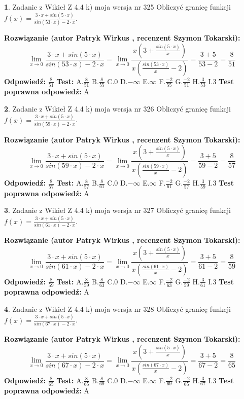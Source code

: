 \documentclass[12pt, a4paper]{article}
\theoremstyle{definition} %
\newtheorem{zad}{}
\newcommand{\zadStart}[1]{\begin{zad}#1\newline}
\newcommand{\zadStop}{\end{zad}}
\newcommand{\rozwStart}[2]{\noindent \textbf{Rozwiązanie (autor #1 , recenzent #2): }\newline}
\newcommand{\rozwStop}{\newline}
\newcommand{\odpStart}{\noindent \textbf{Odpowiedź:}\newline}
\newcommand{\odpStop}{\newline}
\newcommand{\testStart}{\noindent \textbf{Test:}\newline}
\newcommand{\testStop}{\newline}
\newcommand{\kluczStart}{\noindent \textbf{Test poprawna odpowiedź:}\newline}
\newcommand{\kluczStop}{\newline}
\begin{document}
\zadStart{Zadanie z Wikieł Z 4.4 k) moja wersja nr 325}
Obliczyć granicę funkcji $f(x)=\frac{3\cdot x +sin(5\cdot x)}{sin(53\cdot x) -2\cdot x}$.
\zadStop
\rozwStart{Patryk Wirkus}{Szymon Tokarski}
$$\lim\limits_{x\to 0}\frac{3\cdot x +sin(5\cdot x)}{sin(53\cdot x) -2\cdot x}
=\lim\limits_{x\to 0}\frac{x(3+\frac{sin(5\cdot x)}{x})}{x(\frac{sin(53\cdot x)}{x}-2)}
=\frac{3+5}{53-2} = \frac{8}{51}$$
\rozwStop
\odpStart
$\frac{8}{51}$
\odpStop
\testStart
A.$\frac{8}{51}$
B.$\frac{8}{55}$
C.$0$
D.$-\infty$
E.$\infty$
F.$\frac{-2}{55}$
G.$\frac{-2}{51}$
H.$\frac{3}{53}$
I.$3$
\testStop
\kluczStart
A
\kluczStop



\zadStart{Zadanie z Wikieł Z 4.4 k) moja wersja nr 326}
Obliczyć granicę funkcji $f(x)=\frac{3\cdot x +sin(5\cdot x)}{sin(59\cdot x) -2\cdot x}$.
\zadStop
\rozwStart{Patryk Wirkus}{Szymon Tokarski}
$$\lim\limits_{x\to 0}\frac{3\cdot x +sin(5\cdot x)}{sin(59\cdot x) -2\cdot x}
=\lim\limits_{x\to 0}\frac{x(3+\frac{sin(5\cdot x)}{x})}{x(\frac{sin(59\cdot x)}{x}-2)}
=\frac{3+5}{59-2} = \frac{8}{57}$$
\rozwStop
\odpStart
$\frac{8}{57}$
\odpStop
\testStart
A.$\frac{8}{57}$
B.$\frac{8}{61}$
C.$0$
D.$-\infty$
E.$\infty$
F.$\frac{-2}{61}$
G.$\frac{-2}{57}$
H.$\frac{3}{59}$
I.$3$
\testStop
\kluczStart
A
\kluczStop



\zadStart{Zadanie z Wikieł Z 4.4 k) moja wersja nr 327}
Obliczyć granicę funkcji $f(x)=\frac{3\cdot x +sin(5\cdot x)}{sin(61\cdot x) -2\cdot x}$.
\zadStop
\rozwStart{Patryk Wirkus}{Szymon Tokarski}
$$\lim\limits_{x\to 0}\frac{3\cdot x +sin(5\cdot x)}{sin(61\cdot x) -2\cdot x}
=\lim\limits_{x\to 0}\frac{x(3+\frac{sin(5\cdot x)}{x})}{x(\frac{sin(61\cdot x)}{x}-2)}
=\frac{3+5}{61-2} = \frac{8}{59}$$
\rozwStop
\odpStart
$\frac{8}{59}$
\odpStop
\testStart
A.$\frac{8}{59}$
B.$\frac{8}{63}$
C.$0$
D.$-\infty$
E.$\infty$
F.$\frac{-2}{63}$
G.$\frac{-2}{59}$
H.$\frac{3}{61}$
I.$3$
\testStop
\kluczStart
A
\kluczStop



\zadStart{Zadanie z Wikieł Z 4.4 k) moja wersja nr 328}
Obliczyć granicę funkcji $f(x)=\frac{3\cdot x +sin(5\cdot x)}{sin(67\cdot x) -2\cdot x}$.
\zadStop
\rozwStart{Patryk Wirkus}{Szymon Tokarski}
$$\lim\limits_{x\to 0}\frac{3\cdot x +sin(5\cdot x)}{sin(67\cdot x) -2\cdot x}
=\lim\limits_{x\to 0}\frac{x(3+\frac{sin(5\cdot x)}{x})}{x(\frac{sin(67\cdot x)}{x}-2)}
=\frac{3+5}{67-2} = \frac{8}{65}$$
\rozwStop
\odpStart
$\frac{8}{65}$
\odpStop
\testStart
A.$\frac{8}{65}$
B.$\frac{8}{69}$
C.$0$
D.$-\infty$
E.$\infty$
F.$\frac{-2}{69}$
G.$\frac{-2}{65}$
H.$\frac{3}{67}$
I.$3$
\testStop
\kluczStart
A
\kluczStop
\end{document}
